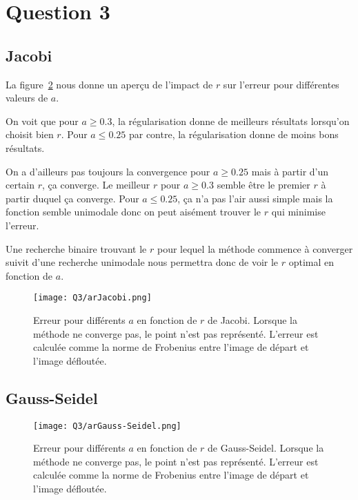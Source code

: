 \section{Question 3}

\subsection{Jacobi}
La figure~\ref{fig:ar} nous donne un aperçu de l'impact de $r$
sur l'erreur pour différentes valeurs de $a$.

On voit que pour $a \geq 0.3$, la régularisation donne de meilleurs résultats
lorsqu'on choisit bien $r$.
Pour $a \leq 0.25$ par contre, la régularisation donne de moins bons résultats.

On a d'ailleurs pas toujours la convergence pour $a \geq 0.25$ mais à partir
d'un certain $r$, ça converge.
Le meilleur $r$ pour $a \geq 0.3$ semble être le premier $r$ à partir duquel
ça converge.
Pour $a \leq 0.25$, ça n'a pas l'air aussi simple mais la fonction semble
unimodale donc on peut aisément trouver le $r$ qui minimise l'erreur.

Une recherche binaire trouvant le $r$ pour lequel la méthode commence à converger
suivit d'une recherche unimodale nous permettra donc de voir le $r$ optimal en
fonction de $a$.

\begin{figure}
  \centering
  \texttt{[image: Q3/arJacobi.png]}
  \caption{Erreur pour différents $a$ en fonction de $r$ de Jacobi.
  Lorsque la méthode ne converge pas, le point n'est pas représenté.
  L'erreur est calculée comme la norme de Frobenius entre l'image de départ
  et l'image défloutée.}
  \label{fig:ar}
\end{figure}

\subsection{Gauss-Seidel}

\begin{figure}
  \centering
  \texttt{[image: Q3/arGauss-Seidel.png]}
  \caption{Erreur pour différents $a$ en fonction de $r$ de Gauss-Seidel.
  Lorsque la méthode ne converge pas, le point n'est pas représenté.
  L'erreur est calculée comme la norme de Frobenius entre l'image de départ
  et l'image défloutée.}
  \label{fig:ar}
\end{figure}
